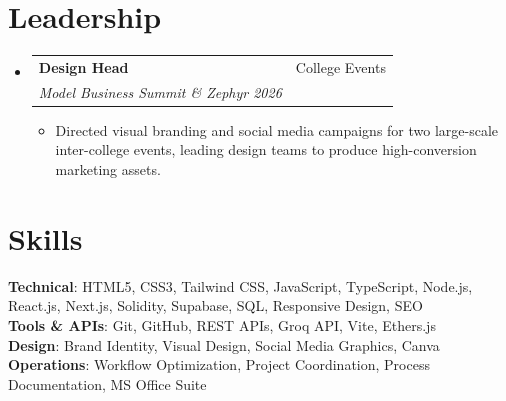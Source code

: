 \documentclass[a4paper,11pt]{article}
\makeatletter
\newcommand{\resumeItem}[1]{
  \item\small{
    {#1 \vspace{-2pt}}
  }
}
\newcommand{\resumeSubheading}[4]{
  \vspace{-2pt}\item
    \begin{tabular*}{0.97\textwidth}[t]{l@{\extracolsep{\fill}}r}
      \textbf{#1} & #2 \\
      \textit{\small#3} & \textit{\small #4} \\
    \end{tabular*}\vspace{-7pt}
}
\newcommand{\resumeSubHeadingListStart}{\begin{itemize}[leftmargin=0.15in, label={}]}
\newcommand{\resumeSubHeadingListEnd}{\end{itemize}}
\newcommand{\resumeItemListStart}{\begin{itemize}}
\newcommand{\resumeItemListEnd}{\end{itemize}\vspace{-5pt}}
\makeatother
\begin{document}
\section{Leadership}
  \resumeSubHeadingListStart
    \resumeSubheading
      {Design Head}{College Events}
      {Model Business Summit \& Zephyr 2026}{}
      \resumeItemListStart
        \resumeItem{Directed visual branding and social media campaigns for two large-scale inter-college events, leading design teams to produce high-conversion marketing assets.}
      \resumeItemListEnd
  \resumeSubHeadingListEnd



%
\section{Skills}
 \begin{itemize}[leftmargin=0.15in, label={}]
    \small{\item{
     \textbf{Technical}{: HTML5, CSS3, Tailwind CSS, JavaScript, TypeScript, Node.js, React.js, Next.js, Solidity, Supabase, SQL, Responsive Design, SEO} \\
     \textbf{Tools \& APIs}{: Git, GitHub, REST APIs, Groq API, Vite, Ethers.js} \\
     \textbf{Design}{: Brand Identity, Visual Design, Social Media Graphics, Canva} \\
     \textbf{Operations}{: Workflow Optimization, Project Coordination, Process Documentation, MS Office Suite}
    }}
 \end{itemize}


\end{document}
